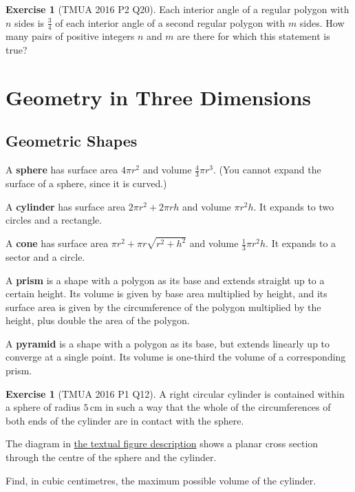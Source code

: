 \documentclass[11pt]{article}
\theoremstyle{definition}
\newtheorem{example}[theorem]{Exercise}
\theoremstyle{remark}
\newcommand{\flatfrac}[2]{\frac{#1}{#2}}
\newcommand{\SI}[2]{#1\,\text{#2}}
\newcommand{\centi}{c}
\newcommand{\metre}{m}
\begin{document}
\begin{example}[TMUA 2016 P2 Q20]\label{tmua-3-unit-021}
    Each interior angle of a regular polygon with \(n\) sides is \(\flatfrac{3}{4}\) of each interior angle of a second regular polygon with \(m\) sides. How many pairs of positive integers \(n\) and \(m\) are there for which this statement is true?
\end{example}

\section{Geometry in Three Dimensions}\label{tmua-3-section-005}
\subsection{Geometric Shapes}\label{tmua-3-subsection-011}

A \textbf{sphere} has surface area \(4 \pi r^2\) and volume \(\frac{4}{3} \pi r^3\). (You cannot expand the surface of a sphere, since it is curved.)

A \textbf{cylinder} has surface area \(2 \pi r^2 + 2 \pi r h\) and volume \(\pi r^2 h\). It expands to two circles and a rectangle.

A \textbf{cone} has surface area \(\pi r^2 + \pi r \sqrt{r^2 + h^2}\) and volume \(\frac{1}{3} \pi r^2 h\). It expands to a sector and a circle.

A \textbf{prism} is a shape with a polygon as its base and extends straight up to a certain height. Its volume is given by base area multiplied by height, and its surface area is given by the circumference of the polygon multiplied by the height, plus double the area of the polygon.

A \textbf{pyramid} is a shape with a polygon as its base, but extends linearly up to converge at a single point. Its volume is one-third the volume of a corresponding prism.

\begin{example}[TMUA 2016 P1 Q12]\label{tmua-3-unit-022}
    A right circular cylinder is contained within a sphere of radius \(\SI{5}{\centi\metre}\) in such a way that the whole of the circumferences of both ends of the cylinder are in contact with the sphere.

    The diagram in \hyperref[fig:tmua-2016-p1-q12]{the textual figure description} shows a planar cross section through the centre of the sphere and the cylinder.

    Find, in cubic centimetres, the maximum possible volume of the cylinder.
\end{example}
\end{document}
